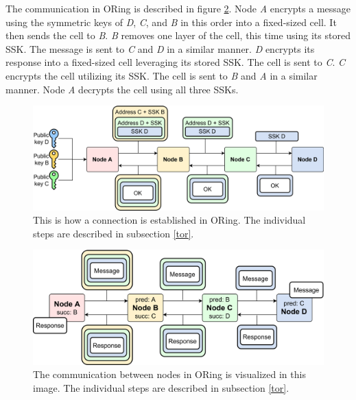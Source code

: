 The communication in ORing is described in figure \ref{ORCom}. Node \textit{A} encrypts a message using the symmetric keys of \textit{D}, \textit{C}, and \textit{B} in this order into a fixed-sized cell. It then sends the cell to \textit{B}. \textit{B} removes one layer of the cell, this time using its stored SSK. The message is sent to \textit{C} and \textit{D} in a similar manner. \textit{D} encrypts its response into a fixed-sized cell leveraging its stored SSK. The cell is sent to \textit{C}. \textit{C} encrypts the cell utilizing its SSK. The cell is sent to \textit{B} and \textit{A} in a similar manner. Node \textit{A} decrypts the cell using all three SSKs. 

\begin{figure}
  \centering
  \includegraphics[width = \textwidth]{Images/OREstablishment.png}
  \caption{This is how a connection is established in ORing. The individual steps are described in subsection \ref{tor}.}
  \label{OREstablishment}
\end{figure}

\begin{figure}
  \centering
  \includegraphics[width = \textwidth]{Images/ORCom.png}
  \caption{The communication between nodes in ORing is visualized in this image. The individual steps are described in subsection \ref{tor}.}
  \label{ORCom}
\end{figure}

